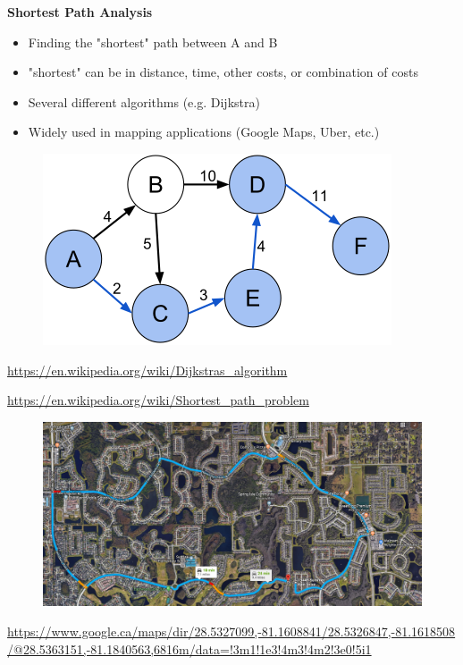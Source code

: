 \documentclass[aspectratio=169]{beamer}
\begin{document}
\begin{frame}
	
	\textbf{Shortest Path Analysis}
	
	\begin{itemize}
		\item Finding the "shortest" path between A and B
		\item "shortest" can be in distance, time, other costs, or combination of costs
		\item Several different algorithms (e.g. Dijkstra)
		\item Widely used in mapping applications (Google Maps, Uber, etc.)
	\end{itemize}
	
	\begin{figure}
		\centering
		\includegraphics[width=0.5\linewidth]{images/shortest_path}
	\end{figure}

	\tiny\url{https://en.wikipedia.org/wiki/Dijkstras_algorithm}
	
	\tiny\url{https://en.wikipedia.org/wiki/Shortest_path_problem}	

\end{frame}




\begin{frame}

	\begin{figure}
		\centering
		\includegraphics[width=0.95 \linewidth]{images/orlando}
	\end{figure}
	\tiny \url{https://www.google.ca/maps/dir/28.5327099,-81.1608841/28.5326847,-81.1618508/@28.5363151,-81.1840563,6816m/data=!3m1!1e3!4m3!4m2!3e0!5i1}
\end{frame}
\end{document}

